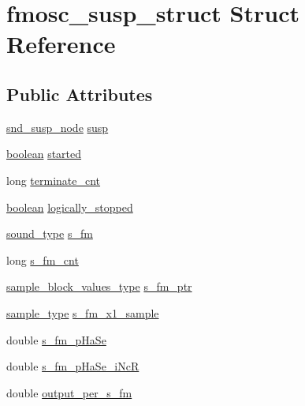 \hypertarget{structfmosc__susp__struct}{}\section{fmosc\+\_\+susp\+\_\+struct Struct Reference}
\label{structfmosc__susp__struct}
\subsection*{Public Attributes}
\begin{DoxyCompactItemize}
\item 
\hyperlink{sound_8h_a6b268203688a934bd798ceb55f85d4c0}{snd\+\_\+susp\+\_\+node} \hyperlink{structfmosc__susp__struct_a8aa3a6dd8fb065ffa4b522dd3048bd32}{susp}
\item 
\hyperlink{cext_8h_a7670a4e8a07d9ebb00411948b0bbf86d}{boolean} \hyperlink{structfmosc__susp__struct_a953ece351b2ca0464cfdd697775c52ac}{started}
\item 
long \hyperlink{structfmosc__susp__struct_a7e984fb12fa0074c3ae7d18a5c9b49d9}{terminate\+\_\+cnt}
\item 
\hyperlink{cext_8h_a7670a4e8a07d9ebb00411948b0bbf86d}{boolean} \hyperlink{structfmosc__susp__struct_a04b94712bd1ff59f99e30528a8cca03b}{logically\+\_\+stopped}
\item 
\hyperlink{sound_8h_a792cec4ed9d6d636d342d9365ba265ea}{sound\+\_\+type} \hyperlink{structfmosc__susp__struct_a6be8a5613e6896e92e3e69299af019cf}{s\+\_\+fm}
\item 
long \hyperlink{structfmosc__susp__struct_a7eccc72b1004de4dcebc4a09930df208}{s\+\_\+fm\+\_\+cnt}
\item 
\hyperlink{sound_8h_a83d17f7b465d1591f27cd28fc5eb8a03}{sample\+\_\+block\+\_\+values\+\_\+type} \hyperlink{structfmosc__susp__struct_a8c6aa6c4681f9671e23c8134791267f2}{s\+\_\+fm\+\_\+ptr}
\item 
\hyperlink{sound_8h_a3a9d1d4a1c153390d2401a6e9f71b32c}{sample\+\_\+type} \hyperlink{structfmosc__susp__struct_a59f0f62833b10e99df2a6f62d874d1b1}{s\+\_\+fm\+\_\+x1\+\_\+sample}
\item 
double \hyperlink{structfmosc__susp__struct_a8f6ae27868a9029693facc9d1369d1ce}{s\+\_\+fm\+\_\+p\+Ha\+Se}
\item 
double \hyperlink{structfmosc__susp__struct_a4ed0b45d7f2e03d47e549f5d63589117}{s\+\_\+fm\+\_\+p\+Ha\+Se\+\_\+i\+NcR}
\item 
double \hyperlink{structfmosc__susp__struct_abe976028ca8758281dda4cb2ec9f728d}{output\+\_\+per\+\_\+s\+\_\+fm}

\end{DoxyCompactItemize}
